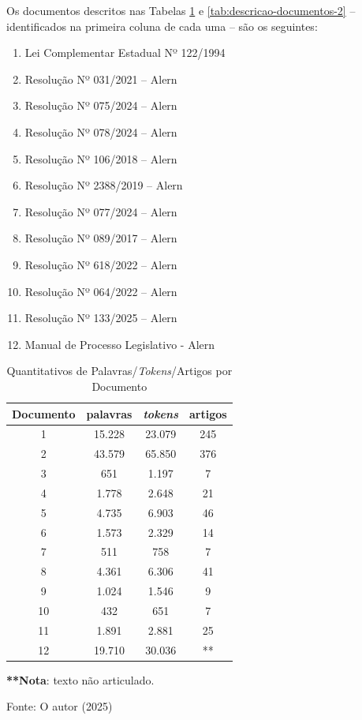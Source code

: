 Os documentos descritos nas Tabelas \ref{tab:descricao-documentos-1} e \ref{tab:descricao-documentos-2} -- identificados na primeira coluna de cada uma -- são
os seguintes:

\begin{enumerate}
    \item Lei Complementar Estadual Nº 122/1994
    \item Resolução Nº 031/2021 – Alern
    \item Resolução Nº 075/2024 – Alern
    \item Resolução Nº 078/2024 – Alern
    \item Resolução Nº 106/2018 – Alern
    \item Resolução Nº 2388/2019 – Alern
    \item Resolução Nº 077/2024 – Alern
    \item Resolução Nº 089/2017 – Alern
    \item Resolução Nº 618/2022 – Alern
    \item Resolução Nº 064/2022 – Alern
    \item Resolução Nº 133/2025 – Alern
    \item Manual de Processo Legislativo - Alern
\end{enumerate}

\begin{table}
    \caption{Quantitativos de Palavras/\textit{Tokens}/Artigos por Documento}
    \centering
    \begin{tabular}{ c c c c }
        \hline
        \textbf{Documento} & \textbf{palavras} & \textbf{\textit{tokens}} & \textbf{artigos} \\  
        \hline
        1 & 15.228 & 23.079 & 245 \\
        2 & 43.579 & 65.850 & 376 \\
        3 & 651 & 1.197 & 7 \\
        4 & 1.778 & 2.648 & 21 \\
        5 & 4.735 & 6.903 & 46 \\
        6 & 1.573 & 2.329 & 14 \\
        7 & 511 & 758 & 7 \\
        8 & 4.361 & 6.306 & 41 \\
        9 & 1.024 & 1.546 & 9 \\
        10 & 432 & 651 & 7 \\
        11 & 1.891 & 2.881 & 25 \\
        12 & 19.710 & 30.036 & ** \\
        \hline
    \end{tabular}
    
    \small \textbf{**Nota}: texto não articulado.
    
    Fonte: O autor (2025)
    \label{tab:descricao-documentos-1}
\end{table}

